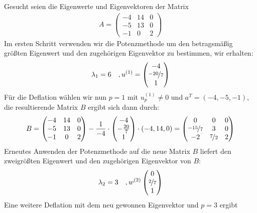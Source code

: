 \begin{egbox}
  Gesucht seien die Eigenwerte und Eigenvektoren der Matrix
  \begin{align*}A = \begin{pmatrix}
    -4 & 14 & 0 \\ -5 & 13 & 0 \\ -1 & 0 & 2
  \end{pmatrix}\end{align*}
  Im ersten Schritt verwenden wir die Potenzmethode um den betragsmäßig größten Eigenwert und den zugehörigen
  Eigenvektor zu bestimmen, wir erhalten:
  \begin{align*}
  \lambda_1=6 \quad, u^{(1)}=\begin{pmatrix}
      -4 \\ \nicefrac{-20}{7} \\ 1
    \end{pmatrix}
  \end{align*}
  Für die Deflation wählen wir nun $p=1$ mit $u_p^{(1)}\neq 0$ und $a^T=(-4, -5, -1)$, die resultierende Matrix $B$
  ergibt sich dann durch:
  \begin{align*}
  B = \begin{pmatrix}
    -4 & 14 & 0 \\ -5 & 13 & 0 \\ -1 & 0 & 2
  \end{pmatrix} - \dfrac{1}{-4}\cdot\begin{pmatrix}
    -4 \\ -\tfrac{20}{7} \\ 1
  \end{pmatrix}\cdot(-4, 14, 0) = \begin{pmatrix}
    0 & 0 & 0 \\ \nicefrac{-15}{7} & 3 & 0 \\ -2 & \nicefrac{7}{2} & 2
  \end{pmatrix}
  \end{align*}
  Erneutes Anwenden der Potenzmethode auf die neue Matrix $B$ liefert den zweigrößten Eigenwert und den
  zugehörigen Eigenvektor von $B$:
  \begin{align*}
    \lambda_2=3 \quad, w^{(2)}\begin{pmatrix}
      0 \\ \nicefrac{2}{7} \\ 1
    \end{pmatrix}
  \end{align*}
  Eine weitere Deflation mit dem neu gewonnen Eigenvektor und $p=3$ ergibt
  \begin{align*}

\end{align*}
\end{egbox}
